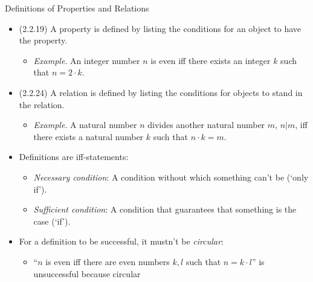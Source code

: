 \documentclass[../slides.tex]{subfiles}
\begin{document}
\begin{frame}{Definitions of Properties and Relations}

	\begin{itemize}
	
		\item (2.2.19) A property is defined by listing the conditions for an object to have the property.
		
		\begin{itemize}
		
			\item \emph{Example}. An integer number $n$ is even iff there exists an integer $k$ such that $n=2\cdot k$.
	
		\end{itemize}
		
		\item (2.2.24) A relation is defined by listing the conditions for objects to stand in the relation.
		
		\begin{itemize}
		
			\item \emph{Example}. A natural number $n$ divides another natural number $m$, $n|m$, iff there exists a natural number $k$ such that $n\cdot k=m$.
	
		\end{itemize}
				
		\item Definitions are iff-statements:
		
		\begin{itemize}
		
			\item \emph{Necessary condition}: A condition without which something can't be (`only if').
			
			\item \emph{Sufficient condition}: A condition that guarantees that something is the case (`if').
		
		\end{itemize}
		
		\item For a definition to be successful, it mustn't be \emph{circular}:
		
		\begin{itemize}
		
			\item ``$n$ is even iff there are even numbers $k,l$ such that $n=k\cdot l$'' is unsuccessful because circular 
		
		\end{itemize}
	
	\end{itemize}

\end{frame}
\end{document}
